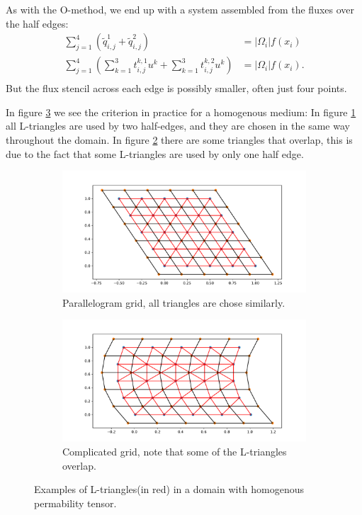 \documentclass[../Main/main.tex]{subfiles}
\begin{document}
	\par
		As with the O-method, we end up with a system assembled from the fluxes over the half edges:
	\begin{equation}
		\begin{aligned}
			\sum_{j=1}^4 (\tilde{q}_{i,j}^1 + \tilde{q}_{i,j}^2) &= |\Omega_i|f(x_i) \\
			\sum_{j=1}^4 (\sum_{k=1}^3 t^{k,1}_{i,j}u^k + \sum_{k=1}^3 t^{k,2}_{i,j}u^k)&= |\Omega_i|f(x_i).\\
		\end{aligned}
	\end{equation}
	But the flux stencil across each edge is possibly smaller, often just four points.
	\par
	In figure \ref{fig:L-triangles} we see the criterion in practice for a homogenous medium: In figure \ref{fig:paralellogram-L} all L-triangles are used by two half-edges, and they are chosen in the same way throughout the domain. In figure \ref{fig:complicated-L} there are some triangles that overlap, this is due to the fact that some L-triangles are used by only one half edge.
	\begin{figure}[H]
		\centering
		\begin{subfigure}[b]{0.8\textwidth}
			\centering
			\includegraphics[width=\textwidth]{L-triangles_paralellogram.pdf}
			\caption{Parallelogram grid, all triangles are chose similarly.}
			\label{fig:paralellogram-L}
		\end{subfigure}
		\hfill
		\begin{subfigure}[b]{0.8\textwidth}
			\centering
			\includegraphics[width=\textwidth]{L-triangles_complex.pdf}
			\caption{Complicated grid, note that some of the L-triangles overlap.}
			\label{fig:complicated-L}
		\end{subfigure}
		\caption{Examples of L-triangles(in red) in a domain with homogenous permability tensor.}
		\label{fig:L-triangles}
	\end{figure}
\end{document}
